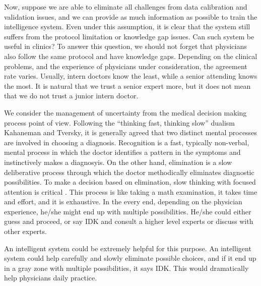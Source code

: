 \documentclass[9pt,twocolumn,twoside]{pnas-new}
\begin{document}
Now, suppose we are able to eliminate all challenges from data
calibration and validation issues, and we can provide as much
information as possible to train the intelligence system. Even under
this assumption, it is clear that the system still suffers from the
protocol limitation or knowledge gap issues. Can such system be useful
in clinics? To answer this question, we should not forget that
physicians also follow the same protocol and have knowledge
gaps. Depending on the clinical problems, and the experience of
physicians under consideration, the agreement rate varies. Usually,
intern doctors know the least, while a senior attending knows the
most. It is natural that we trust a senior expert more, but it does
not mean that we do not trust a junior intern doctor.

We consider the management of uncertainty from the medical decision making process
point of view\cite{vordermark2019introduction}.
Following the ``thinking fast, thinking slow'' dualism Kahaneman and
Tversky, it is generally agreed that
two distinct mental processes are involved in choosing a diagnosis.
Recognition is a fast, typically non-verbal, mental process in which
the doctor identifies a pattern in the symptoms and instinctively
makes a diagnosyis. On the other hand, elimination is a slow
deliberative process through which the doctor methodically eliminates
diagnostic possibilities.
 To make a decision based
on elimination, slow thinking with focused attention is critical
\cite{michel2020thinking}. This process is like taking a math
examination, it takes time and effort, and it is exhaustive. In the
every end, depending on the physician experience, he/she might end up
with multiple possibilities. He/she could either guess and proceed, or
say IDK and consult a higher level experts or discuss with other
experts.

\iffalse %
An intelligent system could be extremely helpful for this
purpose. An intelligent system could help carefully and slowly
eliminate possible choices, and if it end up in a gray zone with
multiple possibilities, it says IDK. This would dramatically help
physicians daily practice.
\end{document}
